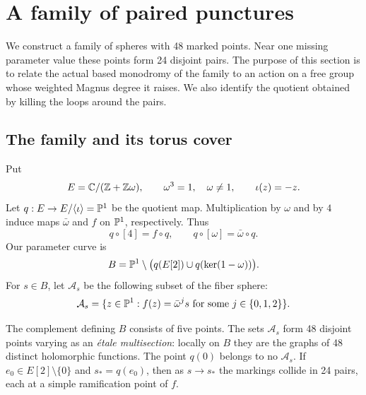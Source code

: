 \section{A family of paired punctures}
\label{sec:family}

We construct a family of spheres with 48 marked points.  Near one missing
parameter value these points form 24 disjoint pairs.  The purpose of this
section is to relate the actual based monodromy of the family to an action
on a free group whose weighted Magnus degree it raises.  We also identify
the quotient obtained by killing the loops around the pairs.

\subsection{The family and its torus cover}

Put
\[
 E=\mathbb C/(\mathbb Z+\mathbb Z\omega),\qquad \omega^3=1,\quad \omega\ne1,
 \qquad \iota(z)=-z.
\]
Let $q:E\to E/\langle\iota\rangle=\mathbb P^1$ be the quotient map.
Multiplication by $\omega$ and by $4$ induce maps $\bar\omega$ and $f$
on $\mathbb P^1$, respectively.  Thus
\[
 q\circ[4]=f\circ q,\qquad q\circ[\omega]=\bar\omega\circ q.
\]
Our parameter curve is
\begin{equation}\label{eq:parameter-base}
 B=\mathbb P^1\setminus
 \bigl(q(E[2])\cup q(\ker(1-\omega))\bigr).
\end{equation}
For $s\in B$, let $\mathcal A_s$ be the following subset of the fiber
sphere:
\begin{equation}\label{eq:sphere-markings}
 \mathcal A_s=\{z\in\mathbb P^1:f(z)=\bar\omega^j s
                  \text{ for some }j\in\{0,1,2\}\}.
\end{equation}

\begin{lemma}\label{lem:family}
The complement defining $B$ consists of five points.  The sets
$\mathcal A_s$ form 48 disjoint points varying as an \emph{\'{e}tale
multisection}: locally on $B$ they are the graphs of 48 distinct
holomorphic functions.  The point $q(0)$ belongs to no $\mathcal A_s$.
If $e_0\in E[2]\setminus\{0\}$ and $s_*=q(e_0)$, then as $s\to s_*$
the markings collide in 24 pairs, each at a simple ramification point
of $f$.
\end{lemma}

